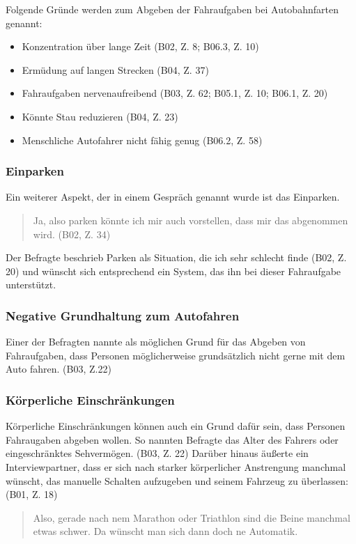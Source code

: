 \documentclass[12pt]{article}
\begin{document}
Folgende Gründe werden zum Abgeben der Fahraufgaben bei Autobahnfarten genannt:
\begin{itemize}
  \item Konzentration über lange Zeit (B02, Z. 8; B06.3, Z. 10)
  \item Ermüdung auf langen Strecken (B04, Z. 37)
  \item Fahraufgaben nervenaufreibend (B03, Z. 62; B05.1, Z. 10; B06.1, Z. 20)
  \item Könnte Stau reduzieren (B04, Z. 23)
  \item Menschliche Autofahrer nicht fähig genug (B06.2, Z. 58)
\end{itemize}

\subsubsection*{Einparken}
Ein weiterer Aspekt, der in einem Gespräch genannt wurde ist das Einparken.

\begin{quote}
  Ja, also parken könnte ich mir auch vorstellen, dass mir das abgenommen wird. (B02, Z. 34)
\end{quote}

Der Befragte beschrieb Parken als \glqq Situation, die ich sehr schlecht finde\grqq{} (B02, Z. 20) und wünscht sich entsprechend ein System, das ihn bei dieser Fahraufgabe unterstützt.

\subsubsection*{Negative Grundhaltung zum Autofahren}
Einer der Befragten nannte als möglichen Grund für das Abgeben von Fahraufgaben, dass Personen möglicherweise grundsätzlich nicht gerne mit dem Auto fahren. (B03, Z.22)

\subsubsection*{Körperliche Einschränkungen}
Körperliche Einschränkungen können auch ein Grund dafür sein, dass Personen Fahraugaben abgeben wollen. So nannten Befragte das Alter des Fahrers oder eingeschränktes Sehvermögen. (B03, Z. 22) Darüber hinaus äußerte ein Interviewpartner, dass er sich nach starker körperlicher Anstrengung manchmal wünscht, das manuelle Schalten aufzugeben und seinem Fahrzeug zu überlassen: (B01, Z. 18)

\begin{quote}
  Also, gerade nach nem Marathon oder Triathlon sind die Beine manchmal etwas schwer. Da wünscht man sich dann doch ne Automatik.
\end{quote}
\end{document}
